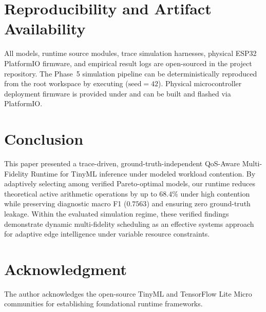 \documentclass[journal]{IEEEtran}
\begin{document}
\section{Reproducibility and Artifact Availability}
All models, runtime source modules, trace simulation harnesses, physical ESP32 PlatformIO firmware, and empirical result logs are open-sourced in the project repository. The Phase~5 simulation pipeline can be deterministically reproduced from the root workspace by executing  ($\text{seed}=42$). Physical microcontroller deployment firmware is provided under  and can be built and flashed via PlatformIO.

\section{Conclusion}
This paper presented a trace-driven, ground-truth-independent QoS-Aware Multi-Fidelity Runtime for TinyML inference under modeled workload contention. By adaptively selecting among verified Pareto-optimal models, our runtime reduces theoretical active arithmetic operations by up to $68.4\%$ under high contention while preserving diagnostic macro F1 ($0.7563$) and ensuring zero ground-truth leakage. Within the evaluated simulation regime, these verified findings demonstrate dynamic multi-fidelity scheduling as an effective systems approach for adaptive edge intelligence under variable resource constraints.

\section*{Acknowledgment}
The author acknowledges the open-source TinyML and TensorFlow Lite Micro communities for establishing foundational runtime frameworks.



\end{document}
